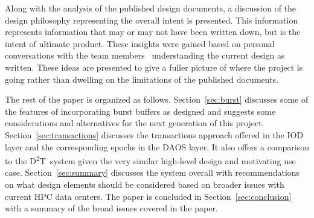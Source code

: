 \documentclass[conference]{IEEEtran}
\newcommand{\DDT}{D\textsuperscript{2}T~}
\begin{document}


Along with the analysis of the published design documents, a discussion of the
design philosophy representing the overall intent is presented. This
information represents information that may or may not have been written down,
but is the intent of ultimate product. These insights were gained based on
personal conversations with the team
members~\cite{JohnBent,QuinceyKoziol,EricBarton} understanding the current
design as written. These ideas are presented to
give a fuller picture of where the project is going rather than dwelling on the
limitations of the published documents.

The rest of the paper is organized as follows. Section~\ref{sec:burst}
discusses some of the features of incorporating burst buffers as designed and
suggests some considerations and alternatives for the next generation of this
project. Section~\ref{sec:transactions} discusses the transactions approach
offered in the IOD layer and the corresponding epochs in the DAOS layer. It
also offers a comparison to the \DDT system given the very similar high-level
design and motivating use case.  Section~\ref{sec:summary} discusses the system
overall with recommendations on what design elements should be considered based
on broader issues with current HPC data centers. The paper is concluded in
Section~\ref{sec:conclusion} with a summary of the broad issues covered in the
paper.
\end{document}
